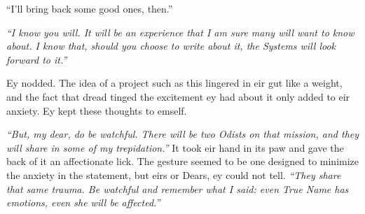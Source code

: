 ``I'll bring back some good ones, then.''

\emph{``I know you will. It will be an experience that I am sure many will want to know about. I know that, should you choose to write about it, the Systems will look forward to it.''}

Ey nodded. The idea of a project such as this lingered in eir gut like a weight, and the fact that dread tinged the excitement ey had about it only added to eir anxiety. Ey kept these thoughts to emself.

\emph{``But, my dear, do be watchful. There will be two Odists on that mission, and they will share in some of my trepidation.''} It took eir hand in its paw and gave the back of it an affectionate lick. The gesture seemed to be one designed to minimize the anxiety in the statement, but eirs or Dears, ey could not tell. \emph{``They share that same trauma. Be watchful and remember what I said: even True Name has emotions, even she will be affected.''}
